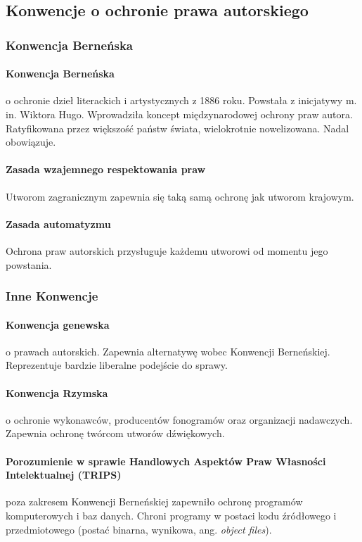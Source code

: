 \documentclass{article}
\begin{document}
\subsection{Konwencje o ochronie prawa autorskiego}

\subsubsection{Konwencja Berneńska}

\paragraph{Konwencja Berneńska}
o ochronie dzieł literackich i artystycznych z 1886 roku. Powstała z inicjatywy m. in. Wiktora Hugo.
Wprowadziła koncept międzynarodowej ochrony praw autora.
Ratyfikowana przez większość państw świata, wielokrotnie nowelizowana. Nadal obowiązuje.

\paragraph{Zasada wzajemnego respektowania praw} Utworom zagranicznym zapewnia się taką samą ochronę jak utworom krajowym.

\paragraph{Zasada automatyzmu}
Ochrona praw autorskich przysługuje każdemu utworowi od momentu jego powstania.

\subsubsection{Inne Konwencje}

\paragraph{Konwencja genewska} o prawach autorskich.
Zapewnia alternatywę wobec Konwencji Berneńskiej.
Reprezentuje bardzie liberalne podejście do sprawy.

\paragraph{Konwencja Rzymska}
o ochronie wykonawców, producentów fonogramów oraz organizacji nadawczych.
Zapewnia ochronę twórcom utworów dźwiękowych.

\paragraph{Porozumienie w sprawie Handlowych Aspektów Praw Własności Intelektualnej (TRIPS)}
poza zakresem Konwencji Berneńskiej zapewniło ochronę programów komputerowych i baz danych.
Chroni programy w postaci kodu źródłowego i przedmiotowego (postać binarna, wynikowa, ang. \textit{object files}).
\end{document}
